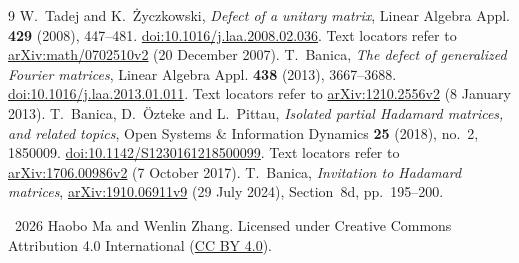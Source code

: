 \documentclass[11pt]{article}
\begin{document}
\begin{thebibliography}{9}
 W.~Tadej and K.~\.{Z}yczkowski, \emph{Defect of a unitary matrix},
Linear Algebra Appl. \textbf{429} (2008), 447--481.
\href{https://doi.org/10.1016/j.laa.2008.02.036}{doi:10.1016/j.laa.2008.02.036}.
Text locators refer to \href{https://arxiv.org/abs/math/0702510v2}{arXiv:math/0702510v2}
(20 December 2007).
 T.~Banica, \emph{The defect of generalized Fourier matrices},
Linear Algebra Appl. \textbf{438} (2013), 3667--3688.
\href{https://doi.org/10.1016/j.laa.2013.01.011}{doi:10.1016/j.laa.2013.01.011}.
Text locators refer to \href{https://arxiv.org/abs/1210.2556v2}{arXiv:1210.2556v2}
(8 January 2013).
 T.~Banica, D.~\"Ozteke and L.~Pittau,
\emph{Isolated partial Hadamard matrices, and related topics},
Open Systems \& Information Dynamics \textbf{25} (2018), no.~2, 1850009.
\href{https://doi.org/10.1142/S1230161218500099}{doi:10.1142/S1230161218500099}.
Text locators refer to \href{https://arxiv.org/abs/1706.00986v2}{arXiv:1706.00986v2}
(7 October 2017).
 T.~Banica, \emph{Invitation to Hadamard matrices},
\href{https://arxiv.org/abs/1910.06911v9}{arXiv:1910.06911v9}
(29 July 2024), Section~8d, pp.~195--200.
\end{thebibliography}
\noindent\small\textcopyright\ 2026 Haobo Ma and Wenlin Zhang.
Licensed under Creative Commons Attribution 4.0 International
(\href{https://creativecommons.org/licenses/by/4.0/}{CC BY 4.0}).
\end{document}
